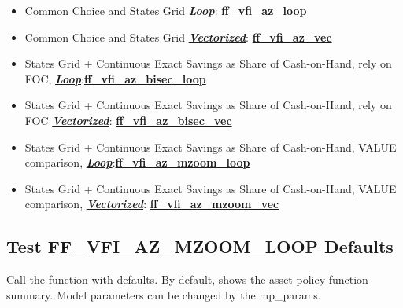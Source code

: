 \documentclass[
]{book}
\begin{document}
\begin{itemize}
\item
  Common Choice and States Grid \underline{\textbf{\emph{Loop}}}:
  \href{https://github.com/FanWangEcon/MEconTools/blob/master/MEconTools/vfi/ff_vfi_az_loop.m}{\textbf{ff\_vfi\_az\_loop}}
\item
  Common Choice and States Grid \underline{\textbf{\emph{Vectorized}}}:
  \href{https://github.com/FanWangEcon/MEconTools/blob/master/MEconTools/vfi/ff_vfi_az_vec.m}{\textbf{ff\_vfi\_az\_vec}}
\item
  States Grid + Continuous Exact Savings as Share of Cash-on-Hand,
  rely on FOC, \underline{\textbf{\emph{Loop}}}:\href{https://github.com/FanWangEcon/MEconTools/blob/master/MEconTools/vfi/ff_vfi_az_bisec_loop.m}{\textbf{ff\_vfi\_az\_bisec\_loop}}
\item
  States Grid + Continuous Exact Savings as Share of Cash-on-Hand,
  rely on FOC \underline{\textbf{\emph{Vectorized}}}:
  \href{https://github.com/FanWangEcon/MEconTools/blob/master/MEconTools/vfi/ff_vfi_az_bisec_vec.m}{\textbf{ff\_vfi\_az\_bisec\_vec}}
\item
  States Grid + Continuous Exact Savings as Share of Cash-on-Hand,
  VALUE comparison, \underline{\textbf{\emph{Loop}}}:\href{https://github.com/FanWangEcon/MEconTools/blob/master/MEconTools/vfi/ff_vfi_az_mzoom_loop.m}{\textbf{ff\_vfi\_az\_mzoom\_loop}}
\item
  States Grid + Continuous Exact Savings as Share of Cash-on-Hand,
  VALUE comparison, \underline{\textbf{\emph{Vectorized}}}:
  \href{https://github.com/FanWangEcon/MEconTools/blob/master/MEconTools/vfi/ff_vfi_az_mzoom_vec.m}{\textbf{ff\_vfi\_az\_mzoom\_vec}}
\end{itemize}

\hypertarget{test-ff_vfi_az_mzoom_loop-defaults}{%
\subsection{Test FF\_VFI\_AZ\_MZOOM\_LOOP Defaults}\label{test-ff_vfi_az_mzoom_loop-defaults}}

Call the function with defaults. By default, shows the asset policy
function summary. Model parameters can be changed by the mp\_params.
\end{document}
